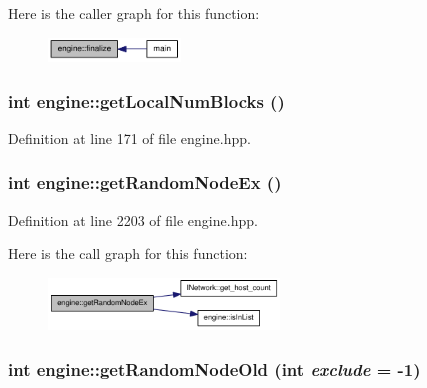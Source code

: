 Here is the caller graph for this function:\nopagebreak
\begin{figure}[H]
\begin{center}
\leavevmode
\includegraphics[width=100pt]{classengine_abe42ab122f70fe47049ad8c1170651a4_icgraph}
\end{center}
\end{figure}
\hypertarget{classengine_ac6030a50a4319513af7be72385d7837c}{
\subsubsection[{getLocalNumBlocks}]{\setlength{\rightskip}{0pt plus 5cm}int engine::getLocalNumBlocks ()}}
\label{classengine_ac6030a50a4319513af7be72385d7837c}


Definition at line 171 of file engine.hpp.\hypertarget{classengine_aa8a57f2a78fcc700597dec842cf537df}{
\subsubsection[{getRandomNodeEx}]{\setlength{\rightskip}{0pt plus 5cm}int engine::getRandomNodeEx ()}}
\label{classengine_aa8a57f2a78fcc700597dec842cf537df}


Definition at line 2203 of file engine.hpp.

Here is the call graph for this function:\nopagebreak
\begin{figure}[H]
\begin{center}
\leavevmode
\includegraphics[width=174pt]{classengine_aa8a57f2a78fcc700597dec842cf537df_cgraph}
\end{center}
\end{figure}
\hypertarget{classengine_a2156b4ae876cbd9345642b9cd580cf1f}{
\subsubsection[{getRandomNodeOld}]{\setlength{\rightskip}{0pt plus 5cm}int engine::getRandomNodeOld (int {\em exclude} = {\ttfamily -\/1})}}
\label{classengine_a2156b4ae876cbd9345642b9cd580cf1f}


